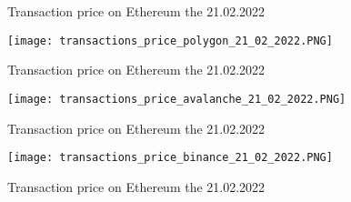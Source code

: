 \documentclass[a4paper,11pt,oneside]{report}
\begin{document}
\begin{center}
\begin{figure}[h!] 
  \caption{Transaction price on Ethereum the 21.02.2022}
  \label{fig:transactions_price_ethereum_21_02_2022}
\end{figure}
\end{center}

\begin{center}
\begin{figure}[h!] 
  \texttt{[image: transactions\_price\_polygon\_21\_02\_2022.PNG]}
  \caption{Transaction price on Ethereum the 21.02.2022}
  \label{fig:transactions_price_polygon_21_02_2022}
\end{figure}
\end{center}

\begin{center}
\begin{figure}[h!] 
  \texttt{[image: transactions\_price\_avalanche\_21\_02\_2022.PNG]}
  \caption{Transaction price on Ethereum the 21.02.2022}
  \label{fig:transactions_price_avalanche_21_02_2022}
\end{figure}
\end{center}

\begin{center}
\begin{figure}[h!] 
  \texttt{[image: transactions\_price\_binance\_21\_02\_2022.PNG]}
  \caption{Transaction price on Ethereum the 21.02.2022}
  \label{fig:transactions_price_binance_21_02_2022}
\end{figure}
\end{center}
\end{document}

